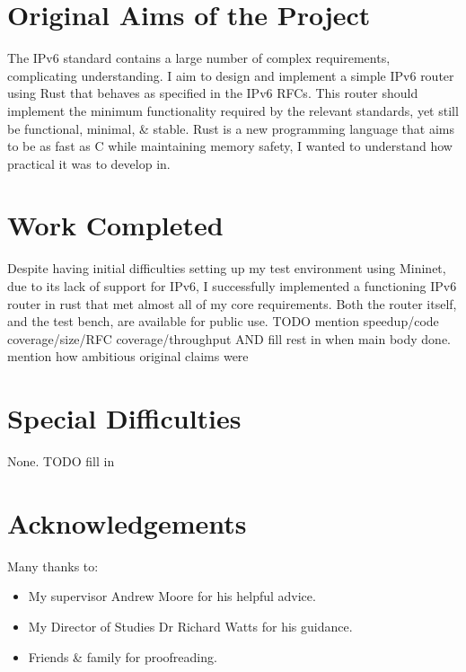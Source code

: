 \documentclass[12pt,a4paper,twoside,openright]{report}
\begin{document}
\section*{Original Aims of the Project}

The IPv6 standard contains a large number of complex requirements, complicating understanding. I aim to design and implement a simple IPv6 router using Rust\cite{rust} that behaves as specified in the IPv6 RFCs\cite{ipv6_rfc}. This router should implement the minimum functionality required by the relevant standards, yet still be functional, minimal, \& stable.  Rust is a new programming language that aims to be as fast as C while maintaining memory safety, I wanted to understand how practical it was to develop in.

\section*{Work Completed}

Despite having initial difficulties setting up my test environment using Mininet\cite{mininet}, due to its lack of support for IPv6, I successfully implemented a functioning IPv6 router in rust that met almost all of my core requirements. Both the router itself, and the test bench, are available for public use.  TODO mention speedup/code coverage/size/RFC coverage/throughput AND fill rest in when main body done. mention how ambitious original claims were

\section*{Special Difficulties}

None. TODO fill in

\tableofcontents
{}
\listoffigures
{}

\newpage
\section*{Acknowledgements}

Many thanks to:
\begin{itemize}
\item My supervisor Andrew Moore for his helpful advice.
\item My Director of Studies Dr Richard Watts for his guidance.
\item Friends \& family for proofreading.
\end{itemize}
\end{document}
